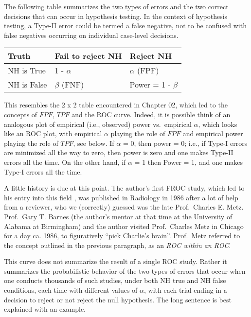 \documentclass[
]{book}
\begin{document}
The following table summarizes the two types of errors and the two correct decisions that can occur in hypothesis testing. In the context of hypothesis testing, a Type-II error could be termed a false negative, not to be confused with false negatives occurring on individual case-level decisions.

\begin{longtable}[]{@{}lll@{}}
\toprule
Truth & Fail to reject NH & Reject NH\tabularnewline
\midrule
\endhead
NH is True & 1 - \(\alpha\) & \(\alpha\) (FPF)\tabularnewline
NH is False & \(\beta\) (FNF) & Power = 1 - \(\beta\)\tabularnewline
\bottomrule
\end{longtable}

This resembles the 2 x 2 table encountered in Chapter 02, which led to the concepts of \(FPF\), \(TPF\) and the ROC curve. Indeed, it is possible think of an analogous plot of empirical (i.e., observed) power vs.~empirical \(\alpha\), which looks like an ROC plot, with empirical \(\alpha\) playing the role of \(FPF\) and empirical power playing the role of \(TPF\), see below. If \(\alpha\) = 0, then power = 0; i.e., if Type-I errors are minimized all the way to zero, then power is zero and one makes Type-II errors all the time. On the other hand, if \(\alpha\) = 1 then Power = 1, and one makes Type-I errors all the time.

A little history is due at this point. The author's first FROC study, which led to his entry into this field \citep{RN621}, was published in Radiology in 1986 after a lot of help from a reviewer, who we (correctly) guessed was the late Prof.~Charles E. Metz. Prof.~Gary T. Barnes (the author's mentor at that time at the University of Alabama at Birmingham) and the author visited Prof.~Charles Metz in Chicago for a day ca. 1986, to figuratively ``pick Charlie's brain''. Prof.~Metz referred to the concept outlined in the previous paragraph, as an \emph{ROC within an ROC}.

This curve does not summarize the result of a single ROC study. Rather it summarizes the probabilistic behavior of the two types of errors that occur when one conducts thousands of such studies, under both NH true and NH false conditions, each time with different values of \(\alpha\), with each trial ending in a decision to reject or not reject the null hypothesis. The long sentence is best explained with an example.
\end{document}
